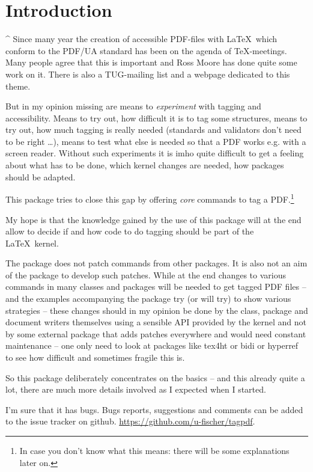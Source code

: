 \documentclass[DIV=12,parskip=half-,bibliography=totoc]{scrartcl}
\newcommand\PDF{PDF}
\begin{document}
\section{Introduction}


\TagP^ Since many year the creation of accessible \PDF{}-files with \LaTeX\ which conform to the PDF/UA standard has been on the agenda of \TeX-meetings. Many people agree that this is important and Ross Moore has done quite some work on it. There is also a TUG-mailing list and a webpage \parencite{tugaccess} dedicated to this theme.

\TagP But in my opinion missing are means to \emph{experiment} with tagging and accessibility. Means to try out, how difficult it is to tag some structures, means to try out, how much tagging is really needed (standards and validators don't need to be right \ldots), means to test what else is needed so that a \PDF{} works e.g. with a screen reader. Without such experiments it is imho quite difficult to get a feeling about what has to be done, which kernel changes are needed, how packages should be adapted.

\TagP This package tries to close this gap by offering \emph{core} commands to tag a \PDF{}.\footnote{In case you don't know what this means: there will be some explanations later on.}

\TagP My hope is that the knowledge gained by the use of this package will at the end allow to decide if and how code to do tagging should be part of the \LaTeX\ kernel.

\TagP The package does not patch commands from other packages. It is also not an aim of the package to develop such patches. While at the end changes to various commands in many classes and packages will be needed to get tagged \PDF{} files -- and the examples accompanying the package try (or will try) to show various strategies -- these changes should in my opinion be done by the class, package and document writers themselves using a sensible API provided by the kernel and not by some external package that adds patches everywhere and would need constant maintenance -- one only need to look at packages like tex4ht or bidi or hyperref to see how difficult and sometimes fragile this is.

\TagP So this package deliberately concentrates on the basics -- and this already quite a lot, there are much more details involved as I expected when I started.

\TagP I'm sure that it has bugs. Bugs reports, suggestions and comments can be added to the issue tracker on github. \url{https://github.com/u-fischer/tagpdf}.
\end{document}
